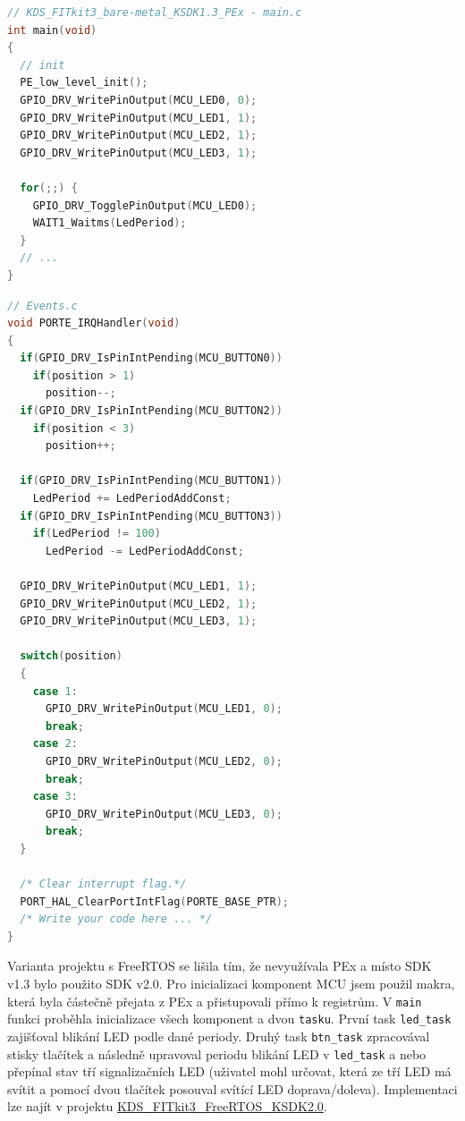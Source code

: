 \documentclass[a4paper]{article}
\begin{document}
\begin{lstlisting}[language=c]
// KDS_FITkit3_bare-metal_KSDK1.3_PEx - main.c
int main(void)
{
  // init
  PE_low_level_init();
  GPIO_DRV_WritePinOutput(MCU_LED0, 0);
  GPIO_DRV_WritePinOutput(MCU_LED1, 1);
  GPIO_DRV_WritePinOutput(MCU_LED2, 1);
  GPIO_DRV_WritePinOutput(MCU_LED3, 1); 
 
  for(;;) {
    GPIO_DRV_TogglePinOutput(MCU_LED0);
    WAIT1_Waitms(LedPeriod);
  }
  // ... 
}
\end{lstlisting}

\newpage

\begin{lstlisting}[language=c]
// Events.c
void PORTE_IRQHandler(void)
{
  if(GPIO_DRV_IsPinIntPending(MCU_BUTTON0))
    if(position > 1)
      position--;
  if(GPIO_DRV_IsPinIntPending(MCU_BUTTON2))
    if(position < 3)
      position++;

  if(GPIO_DRV_IsPinIntPending(MCU_BUTTON1))
    LedPeriod += LedPeriodAddConst;
  if(GPIO_DRV_IsPinIntPending(MCU_BUTTON3))
    if(LedPeriod != 100)
      LedPeriod -= LedPeriodAddConst;

  GPIO_DRV_WritePinOutput(MCU_LED1, 1);
  GPIO_DRV_WritePinOutput(MCU_LED2, 1);
  GPIO_DRV_WritePinOutput(MCU_LED3, 1);

  switch(position)
  {
    case 1:
      GPIO_DRV_WritePinOutput(MCU_LED1, 0);
      break;
    case 2:
      GPIO_DRV_WritePinOutput(MCU_LED2, 0);
      break;
    case 3:
      GPIO_DRV_WritePinOutput(MCU_LED3, 0);
      break;
  }

  /* Clear interrupt flag.*/
  PORT_HAL_ClearPortIntFlag(PORTE_BASE_PTR);
  /* Write your code here ... */
}  
\end{lstlisting}

Varianta projektu s FreeRTOS se lišila tím, že nevyužívala PEx a místo SDK v1.3 bylo použito SDK v2.0. Pro inicializaci komponent MCU jsem použil makra, která byla částečně přejata z PEx a přistupovali přímo k registrům. V  \verb|main| funkci proběhla inicializace všech komponent a dvou \verb|tasku|. První task \verb|led_task| zajišťoval blikání LED podle dané periody. Druhý task \verb|btn_task| zpracovával stisky tlačítek a následně upravoval periodu blikání LED v \verb|led_task| a nebo přepínal stav tří signalizačních LED (uživatel mohl určovat, která ze tří LED má svítit a pomocí dvou tlačítek posouval svítící LED doprava/doleva). Implementaci lze najít v projektu \href{https://github.com/JarekParal/IMP-project/tree/master/projects/KDS_FITkit3_FreeRTOS_KSDK2.0}{KDS\_FITkit3\_FreeRTOS\_KSDK2.0}.
\end{document}
